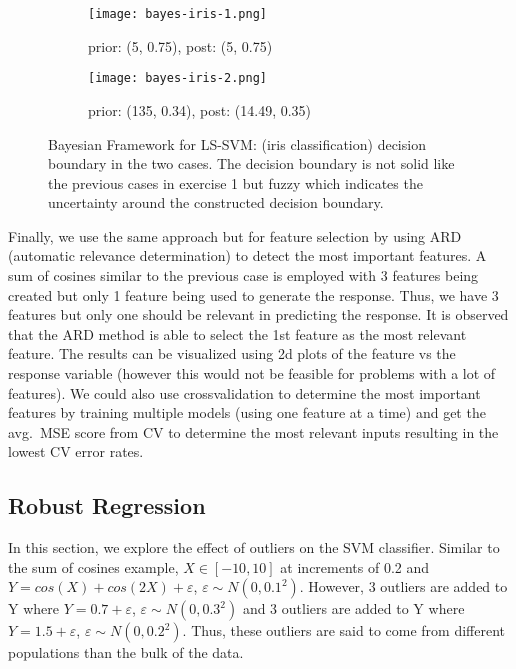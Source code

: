 \documentclass[paper=a4, fontsize=11pt]{scrartcl} %
\numberwithin{equation}{section} %
\begin{document}
\begin{figure}[ht]
\centering
	\begin{subfigure}[b]{0.5\textwidth}
		\centering
		\texttt{[image: bayes-iris-1.png]}
		\caption{prior: (5, 0.75), post: (5, 0.75)}
	\end{subfigure}%
	\begin{subfigure}[b]{0.5\textwidth}
		\centering
		\texttt{[image: bayes-iris-2.png]}
		\caption{prior: (135, 0.34), post: (14.49, 0.35)}
	\end{subfigure}
\caption{Bayesian Framework for LS-SVM: (iris classification) decision boundary in the two cases. The decision boundary is not solid like the previous cases in exercise 1 but fuzzy which indicates the uncertainty around the constructed decision boundary.}
\label{bayes-iris}
\end{figure}

Finally, we use the same approach but for feature selection by using ARD (automatic relevance determination) to detect the most important features. A sum of cosines similar to the previous case is employed with 3 features being created but only 1 feature being used to generate the response. Thus, we have 3 features but only one should be relevant in predicting the response. It is observed that the ARD method is able to select the 1st feature as the most relevant feature. The results can be visualized using 2d plots of the feature vs the response variable (however this would not be feasible for problems with a lot of features). We could also use crossvalidation to determine the most important features by training multiple models (using one feature at a time) and get the avg.\ MSE score from CV to determine the most relevant inputs resulting in the lowest CV error rates.

\subsection{Robust Regression}

In this section, we explore the effect of outliers on the SVM classifier. Similar to the sum of cosines example, $X \in [-10,10]$ at increments of 0.2 and $Y = cos(X) + cos(2X) + \varepsilon$, $\varepsilon \sim N(0, 0.1^2)$. However, 3 outliers are added to Y where $Y = 0.7 + \varepsilon$, $\varepsilon \sim N(0, 0.3^2)$ and 3 outliers are added to Y where $Y = 1.5 + \varepsilon$, $\varepsilon \sim N(0, 0.2^2)$. Thus, these outliers are said to come from different populations than the bulk of the data.\\
\end{document}
